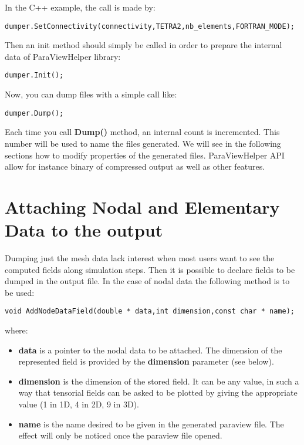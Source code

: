 In the C++ example, the call is made by:
\begin{lstlisting}[frame=tb,backgroundcolor=\color{white}]
dumper.SetConnectivity(connectivity,TETRA2,nb_elements,FORTRAN_MODE);
\end{lstlisting}

Then an init method should simply be called in order to prepare the internal data of ParaViewHelper library:
\begin{lstlisting}[frame=tb,backgroundcolor=\color{white}]
dumper.Init();
\end{lstlisting}
Now, you can dump files with a simple call like:
\begin{lstlisting}[frame=tb,backgroundcolor=\color{white}]
dumper.Dump();
\end{lstlisting}

Each time you call {\bf Dump()} method, an internal count is incremented. This number will be used
to name the files generated. We will see in the following sections how to modify properties of the
generated files. ParaViewHelper API allow for instance binary of compressed output as well as other features.

\section{Attaching Nodal and Elementary Data to the output}

Dumping just the mesh data lack interest when most users want to see the computed fields along simulation
steps. Then it is possible to declare fields to be dumped in the output file. In the case of nodal data the
following method is to be used:

\begin{lstlisting}[frame=tbrl]
void AddNodeDataField(double * data,int dimension,const char * name);
\end{lstlisting}
where:
\begin{itemize}
\item {\bf data} is a pointer to the nodal data to be attached. The dimension of the represented field
is provided by the {\bf dimension} parameter (see below).
\item {\bf dimension} is the dimension of the stored field. It can be any value, in such a way that tensorial fields
can be asked to be plotted by giving the appropriate value (1 in 1D, 4 in 2D, 9 in 3D).
\item {\bf name} is the name desired to be given in the generated paraview file. The effect will only be noticed 
once the paraview file opened. \\
\end{itemize}

